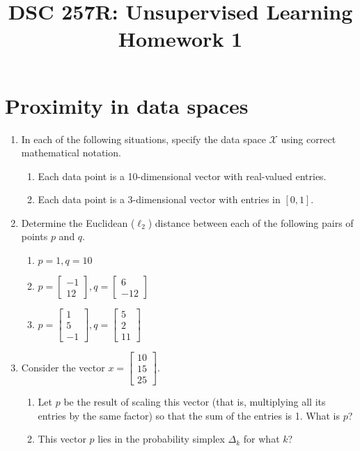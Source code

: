\documentclass{article}
\title{DSC 257R: Unsupervised Learning \\ Homework 1}
\author{}
\date{}
\begin{document}
\maketitle

\section*{Proximity in data spaces}

\begin{enumerate}

\item In each of the following situations, specify the data space $\mathcal{X}$ using correct mathematical notation.
    \begin{enumerate}
    \item Each data point is a 10-dimensional vector with real-valued entries.
    \item Each data point is a 3-dimensional vector with entries in $[0,1]$.
    \end{enumerate}

\item Determine the Euclidean ($\ell_{2}$) distance between each of the following pairs of points $p$ and $q$.
    \begin{enumerate}
    \item $p=1, q=10$
    \item $p=\begin{bmatrix} -1 \\ 12 \end{bmatrix}, q=\begin{bmatrix} 6 \\ -12 \end{bmatrix}$
    \item $p=\begin{bmatrix} 1 \\ 5 \\ -1 \end{bmatrix}, q=\begin{bmatrix} 5 \\ 2 \\ 11 \end{bmatrix}$
    \end{enumerate}

\item Consider the vector $x=\begin{bmatrix} 10 \\ 15 \\ 25 \end{bmatrix}$.
    \begin{enumerate}
    \item Let $p$ be the result of scaling this vector (that is, multiplying all its entries by the same factor) so that the sum of the entries is 1. What is $p$?
    \item This vector $p$ lies in the probability simplex $\Delta_{k}$ for what $k$?
    \end{enumerate}


\end{enumerate}
\end{document}

